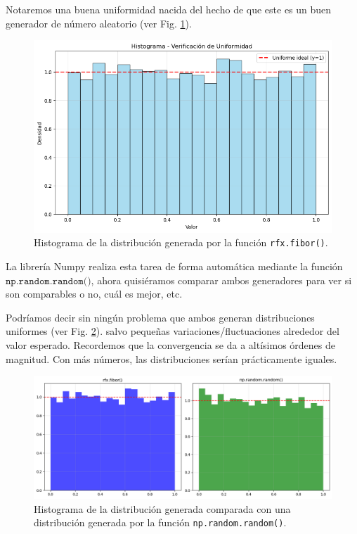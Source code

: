 \documentclass[baaa]{baaa}
\begin{document}
Notaremos una buena uniformidad nacida del hecho de que este es un buen generador de número aleatorio (ver Fig. \ref{fibohisto}).

\begin{figure}[!h]
    \centering
    \includegraphics[width=0.9\linewidth]{imagenes/fibohisto.png}
    \caption{Histograma de la distribución generada por la función \texttt{rfx.fibor()}.}
    \label{fibohisto}
\end{figure}

La librería Numpy realiza esta tarea de forma automática mediante la función $\texttt{np.random.random()}$, ahora quisiéramos comparar ambos generadores para ver si son comparables o no, cuál es mejor, etc.

Podríamos decir sin ningún problema que ambos generan distribuciones uniformes (ver Fig. \ref{fibohistovnp}). salvo pequeñas variaciones/fluctuaciones alrededor del valor esperado. Recordemos que la convergencia se da a altísimos órdenes de magnitud. Con más números, las distribuciones serían prácticamente iguales.

\begin{figure}[!h]
    \centering
    \includegraphics[width=0.9\linewidth]{imagenes/fibohistovnp.png}
    \caption{Histograma de la distribución generada comparada con una distribución generada por la función \texttt{np.random.random()}.}
    \label{fibohistovnp}
\end{figure}
\end{document}
